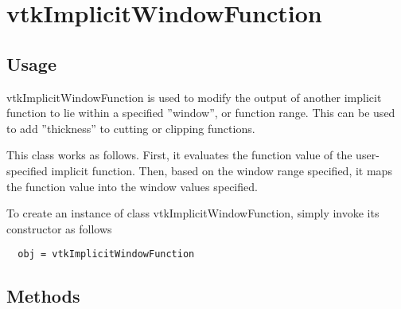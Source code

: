\section{vtkImplicitWindowFunction}

\subsection{Usage}

 vtkImplicitWindowFunction is used to modify the output of another
 implicit function to lie within a specified ''window'', or function
 range. This can be used to add ''thickness'' to cutting or clipping
 functions. 

 This class works as follows. First, it evaluates the function value of the 
 user-specified implicit function. Then, based on the window range specified,
 it maps the function value into the window values specified. 


To create an instance of class vtkImplicitWindowFunction, simply
invoke its constructor as follows
\begin{verbatim}
  obj = vtkImplicitWindowFunction
\end{verbatim}
\subsection{Methods}

